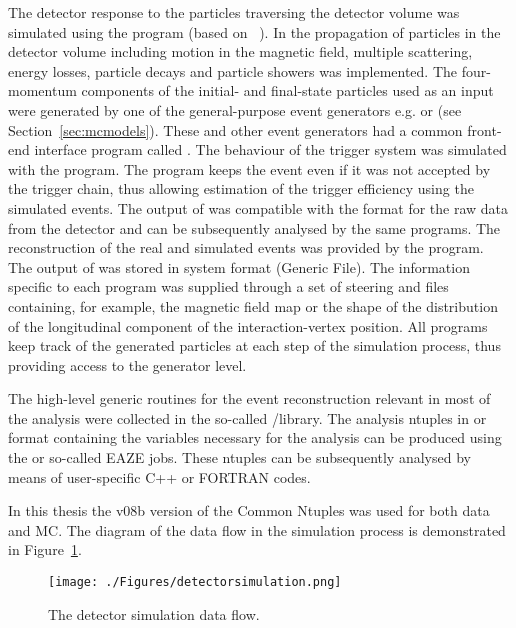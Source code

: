The detector response to the particles traversing the detector volume was simulated using the \mozart program (based on ~\cite{tech:cern-dd-ee-84-1}). In \mozart the propagation of particles in the detector volume including motion in the magnetic field, multiple scattering, energy losses, particle decays and particle showers was implemented. The four-momentum components of the initial- and final-state particles used as an input were generated by one of the general-purpose event generators e.g. \lepto or \ariadne (see Section~\ref{sec:mcmodels}). These and other event generators had a common front-end interface program called \amadeus. The behaviour of the trigger system was simulated with the \zgana program. The \zgana program keeps the event even if it was not accepted by the trigger chain, thus allowing estimation of the trigger efficiency using the simulated events. The output of \zgana was compatible with the format for the raw data from the detector and can be subsequently analysed by the same programs. The reconstruction of the real and simulated events was provided by the \zephyr program. The output of \zephyr was stored in \adamo system format \gaf (Generic \adamo File). The information specific to each program was supplied through a set of steering and \gaf files containing, for example, the magnetic field map or the shape of the distribution of the longitudinal component of the interaction-vertex position. All programs keep track of the generated particles at each step of the simulation process, thus providing access to the generator level.

The high-level generic routines for the event reconstruction relevant in most of the analysis were collected in the so-called \orange/\PHANTOM library. The analysis ntuples in \paw or \rootpaw format containing the variables necessary for the analysis can be produced using the \orange or so-called EAZE jobs. These ntuples can be subsequently analysed by means of user-specific C++ or FORTRAN codes. 

In this thesis the v08b version of the Common Ntuples was used for both data and MC. The diagram of the data flow in the simulation process is demonstrated in Figure~\ref{fig:detectorsimulation}.

\begin{figure}[p]
	\centering
		\texttt{[image: ./Figures/detectorsimulation.png]}
	\caption{The \zeus detector simulation data flow.}
	\label{fig:detectorsimulation}
\end{figure}
